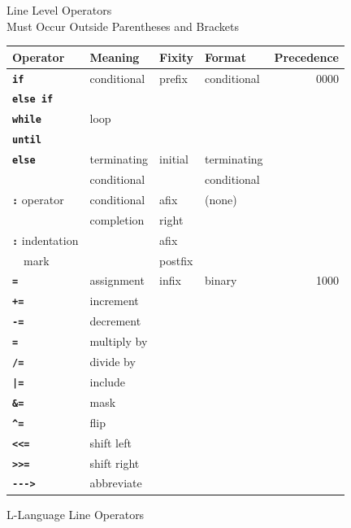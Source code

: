\documentclass[12pt]{article}
\newcommand{\ABV}{-{}-{}->}
\newcommand{\ttkey}[1]{{\tt \bfseries #1}}
\newlength{\figurewidth}
\newenvironment{boxedfigure}[1][!btp]%
	{\begin{figure*}[#1]
	 \begin{lrbox}{\figurebox}
	 \begin{minipage}{\figurewidth}

	 \vspace*{1ex}}%
	{
	 \vspace*{1ex}

	 \end{minipage}
	 \end{lrbox}

	 \centering
	 \fbox{\hspace*{0.1in}\usebox{\figurebox}\hspace*{0.1in}}
	 \end{figure*}}
\begin{document}
\begin{boxedfigure}[!t]
\begin{center}
Line Level Operators \\
Must Occur Outside Parentheses and Brackets
\\[1ex]
\begin{tabular}{|l|l|l|l|r|}
\hline
Operator & Meaning & Fixity & Format & Precedence \\
\hline
\ttkey{if} & conditional & prefix & conditional & 0000
\\\cline{1-1}
\ttkey{else if} & & & &
\\\cline{1-2}
\ttkey{while} & loop & & &
\\\cline{1-1}
\ttkey{until} & & & &
\\\cline{1-4}
\ttkey{else} & terminating & initial & terminating & \\
             & conditional & & conditional &
\\\cline{1-4}
\ttkey{:} operator & conditional & afix & (none) & \\
                   & completion & right & &
\\\cline{1-1}\cline{3-3}
\ttkey{:} indentation & & afix & & \\
~~mark                & & postfix & &
\\\hline
\ttkey{=} & assignment & infix & binary & 1000
\\\cline{1-2}
\ttkey{+=} & increment & & &
\\\cline{1-2}
\ttkey{-=} & decrement & & &
\\\cline{1-2}
\ttkey{*=} & multiply by & & &
\\\cline{1-2}
\ttkey{/=} & divide by & & &
\\\cline{1-2}
\ttkey{|=} & include & & &
\\\cline{1-2}
\ttkey{\&=} & mask & & &
\\\cline{1-2}
\ttkey{\textasciicircum=} & flip & & &
\\\cline{1-2}
\ttkey{<{}<=} & shift left & & &
\\\cline{1-2}
\ttkey{>{}>=} & shift right & & &
\\\cline{1-2}
\ttkey{\ABV} & abbreviate & & &
\\\hline
\end{tabular}
\end{center}

\caption{L-Language Line Operators}
\label{L-LANGUAGE-LINE-OPERATORS}
\end{boxedfigure}
\end{document}

